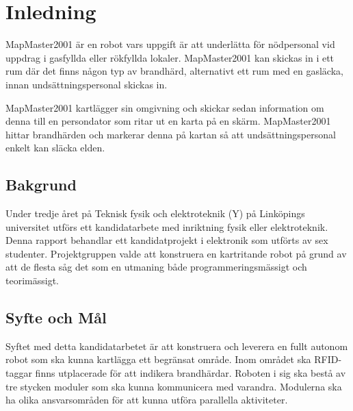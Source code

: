 \documentclass[a4paper,12pt,fleqn]{article}
\begin{document}

\thispagestyle{empty}
\addto\captionsswedish{\renewcommand{\contentsname}{Innehållsförteckning}}

\pagestyle{empty}
\tableofcontents
\cleardoublepage
\newpage
\listoffigures
\newpage

\pagestyle{fancy}



\section{Inledning} 
MapMaster2001 är en robot vars uppgift är att underlätta för nödpersonal vid uppdrag i gasfyllda eller rökfyllda lokaler. MapMaster2001 kan skickas in i ett rum där det finns någon typ av brandhärd, alternativt ett rum med en gasläcka, innan undsättningspersonal skickas in. 

MapMaster2001 kartlägger sin omgivning och skickar sedan information om denna till en persondator som ritar ut en karta på en skärm. MapMaster2001 hittar brandhärden och markerar denna på kartan så att undsättningspersonal enkelt kan släcka elden. 

\subsection{Bakgrund}
Under tredje året på Teknisk fysik och elektroteknik (Y) på Linköpings universitet utförs ett kandidatarbete
med inriktning fysik eller elektroteknik. Denna rapport behandlar ett kandidatprojekt i elektronik som utförts av sex studenter. Projektgruppen valde att konstruera en kartritande robot på grund av att de flesta såg det som en utmaning både programmeringsmässigt och teorimässigt.

\subsection{Syfte och Mål}
Syftet med detta kandidatarbetet är att konstruera och leverera en fullt autonom robot som ska kunna kartlägga ett begränsat område. Inom området ska RFID-taggar finns utplacerade för att indikera brandhärdar. Roboten i sig ska bestå av tre stycken moduler som ska kunna kommunicera med varandra. Modulerna ska ha olika ansvarsområden för att kunna utföra parallella aktiviteter. 
\end{document}
